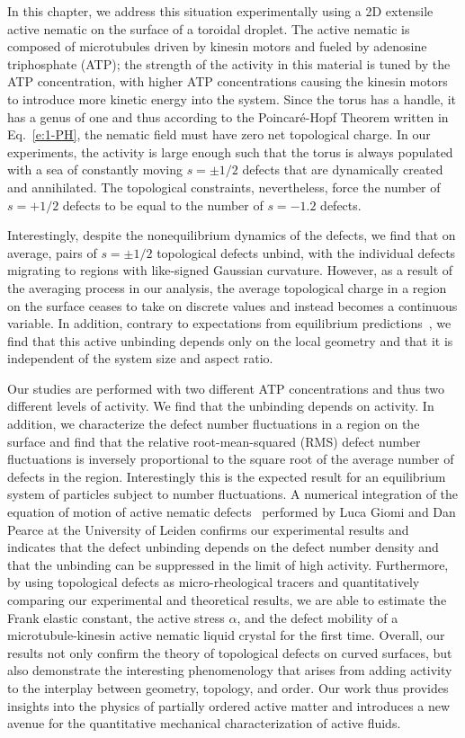 In this chapter, we address this situation experimentally using a 2D extensile active nematic on the surface of a toroidal droplet.
The active nematic is composed of microtubules driven by kinesin motors and fueled by adenosine triphosphate (ATP); the strength of the activity in this material is tuned by the ATP concentration, with higher ATP concentrations causing the kinesin motors to introduce more kinetic energy into the system.
Since the torus has a handle, it has a genus of one and thus according to the Poincar\'e-Hopf Theorem written in Eq.~\ref{e:1-PH}, the nematic field must have zero net topological charge.
In our experiments, the activity is large enough such that the torus is always populated with a sea of constantly moving $s = \pm 1/2$ defects that are dynamically created and annihilated.
The topological constraints, nevertheless, force the number of $s = +1/2$ defects to be equal to the number of $s = -1.2$ defects.

Interestingly, despite the nonequilibrium dynamics of the defects, we find that on average, pairs of $s = \pm 1/2$ topological defects unbind, with the individual defects migrating to regions with like-signed Gaussian curvature.
However, as a result of the averaging process in our analysis, the average topological charge in a region on the surface ceases to take on discrete values and instead becomes a continuous variable.
In addition, contrary to expectations from equilibrium predictions~\cite{RN36,RN19,RN22,RN20,RN78}, we find that this active unbinding depends only on the local geometry and that it is independent of the system size and aspect ratio.

Our studies are performed with two different ATP concentrations and thus two different levels of activity.
We find that the unbinding depends on activity.
In addition, we characterize the defect number fluctuations in a region on the surface and find that the relative root-mean-squared (RMS) defect number fluctuations is inversely proportional to the square root of the average number of defects in the region.
Interestingly this is the expected result for an equilibrium system of particles subject to number fluctuations.
A numerical integration of the equation of motion of active nematic defects~\cite{RN11,RN8,RN9} performed by Luca Giomi and Dan Pearce at the University of Leiden confirms our experimental results and indicates that the defect unbinding depends on the defect number density and that the unbinding can be suppressed in the limit of high activity.
Furthermore, by using topological defects as micro-rheological tracers and quantitatively comparing our experimental and theoretical results, we are able to estimate the Frank elastic constant, the active stress $\alpha$, and the defect mobility of a microtubule-kinesin active nematic liquid crystal for the first time.
Overall, our results not only confirm the theory of topological defects on curved surfaces, but also demonstrate the interesting phenomenology that arises from adding activity to the interplay between geometry, topology, and order.
Our work thus provides insights into the physics of partially ordered active matter and introduces a new avenue for the quantitative mechanical characterization of active fluids.


